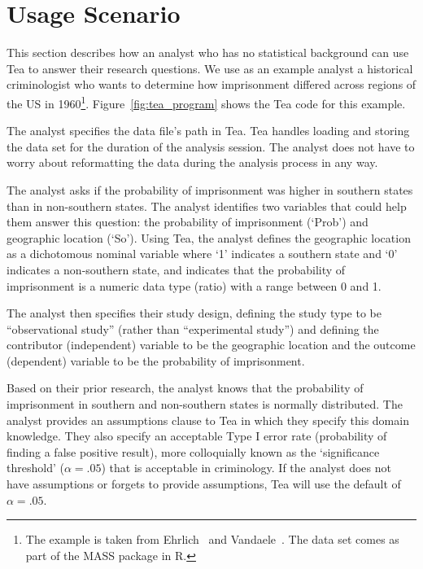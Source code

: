 \section{Usage Scenario}\label{sec:usagescenario}
\figureTeaProgram
This section describes how an analyst who has no statistical
background can use Tea to answer their research questions. We use as
an example analyst a historical criminologist who wants to determine
how imprisonment differed across regions of the US in
1960\footnote{The example is taken
  from Ehrlich~\cite{ehrlich1973participation}
  and Vandaele~\cite{vandaele1987participation}. The data set comes as part of
  the MASS package in R.}. Figure~\ref{fig:tea_program} shows the Tea
code for this example.

The analyst specifies the data file's path in Tea. Tea handles loading and
storing the data set for the duration of the analysis session. The analyst does
not have to worry about reformatting the data during the analysis process in any way.

The analyst asks if the probability of imprisonment was higher in
southern states than in non-southern states. The analyst identifies
two variables that could help them answer this question: the
probability of imprisonment (`Prob') and geographic location
(`So'). %
Using Tea, the analyst defines the geographic
location as a dichotomous nominal variable where `1' indicates a
southern state and `0' indicates a non-southern state, and indicates that the
probability of imprisonment is a numeric data type (ratio) with a
range between 0 and 1. %

The analyst then specifies their study design, defining the study type
to be ``observational study'' (rather than ``experimental study'') and
defining the contributor (independent) variable to be the geographic location and
the outcome (dependent) variable to be the probability of
imprisonment.

Based on their prior research, the analyst knows that the probability
of imprisonment in southern and non-southern states is normally
distributed. The analyst provides an assumptions clause to Tea in
which they specify this domain knowledge. They also specify an
acceptable Type I error rate (probability of finding a false positive
result), more colloquially known as the `significance threshold'
($\alpha = .05$) that is acceptable in criminology. If the analyst
does not have assumptions or forgets to provide assumptions, Tea will
use the default of $\alpha = .05$.


